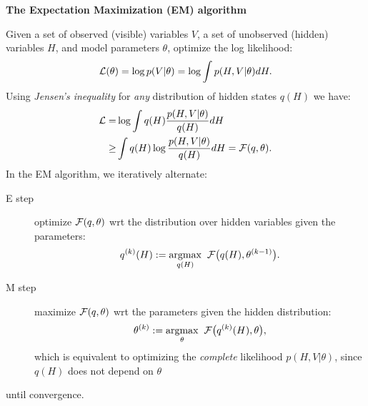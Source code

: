 \documentclass{slides}
\newcommand{\heading}[1]{\begin{center}\large\bf #1\end{center}}
\newcommand{\argmax}{\operatorname{argmax}}
\begin{document}
\begin{slide}
\heading{The Expectation Maximization (EM) algorithm}

Given a set of observed (visible) variables $V$, a set of unobserved (hidden)
variables $H$, and model parameters $\theta$, optimize the log likelihood:
%
\begin{equation}
{\cal L}(\theta)=\log p(V|\theta)=\log \int p(H,V|\theta)dH.
\end{equation}
%
Using \emph{Jensen's inequality} for \emph{any} distribution of hidden states
$q(H)$ we have:
%
\begin{equation}
\begin{split}
{\cal L}=&\log\int q(H)\frac{p(H,V|\theta)}{q(H)}dH\\
\geq&\int q(H)\log\frac{p(H,V|\theta)}{q(H)}dH={\cal F}(q,\theta).
\end{split}
\end{equation}
%
In the EM algorithm, we iteratively alternate:
%
\vspace*{-0.4in}
\begin{description}
\item[E step] optimize ${\cal F}(q,\theta)$ wrt the distribution over hidden
variables given the parameters:
\begin{equation}
q^{(k)}(H):=\underset{q(H)}{\argmax}\;\;{\cal F}\big(q(H),\theta^{(k-1)}\big).
\end{equation}
\vspace*{-1.0in}\phantom{eeeks}
\item[M step] maximize ${\cal F}(q,\theta)$ wrt the parameters given
the hidden distribution:
\begin{equation}
\theta^{(k)}:=\underset{\theta}{\argmax}\;\;
{\cal F}\big(q^{(k)}(H),\theta\big),
\end{equation}
which is equivalent to optimizing the \emph{complete} likelihood
$p(H,V|\theta)$, since $q(H)$ does not depend on $\theta$
\end{description}
\vspace*{-0.5in}
until convergence.

\end{slide}
\end{document}
